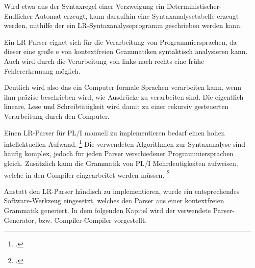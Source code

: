 Wird etwa aus der Syntaxregel einer Verzweigung ein Deterministischer-Endlicher-Automat erzeugt, kann
daraufhin eine Syntaxanalysetabelle erzeugt werden, mithilfe
der ein LR-Syntaxanalyseprogramm geschrieben werden kann.

Ein LR-Parser eignet sich für die Verarbeitung von Programmiersprachen, da dieser eine große e von kontextfreien Grammatiken syntaktisch analysieren kann.
Auch wird durch die Verarbeitung von links-nach-rechts eine frühe Fehlererkennung möglich.

Deutlich wird also das ein Computer formale Sprachen verarbeiten kann, wenn ihm präzise beschrieben wird, wie Ausdrücke zu verarbeiten sind. 
Die eigentlich lineare, Lese und Schreibtätigkeit wird damit zu einer rekursiv gesteuerten Verarbeitung durch den Computer.

Einen LR-Parser für PL/I manuell zu implementieren bedarf einen hohen intellektuellen Aufwand. \footcite[Vgl. ][S. 27ff. ]{compibau}
Die verwendeten Algorithmen zur Syntaxanalyse sind häufig komplex, jedoch für jeden Parser verschiedener Programmiersprachen gleich. 
Zusätzlich kann die Grammatik von PL/I Mehrdeutigkeiten aufweisen, welche in den Compiler eingearbeitet werden müssen.
\footcite[Vgl. ][S. 262ff. ]{compibau}

Anstatt den LR-Parser händisch zu implementieren, wurde ein entsprechendes Software-Werkzeug eingesetzt, welches den Parser aus einer kontextfreien Grammatik generiert.
In dem folgenden Kapitel wird der verwendete Parser-Generator, bzw. Compiler-Compiler vorgestellt.




     
